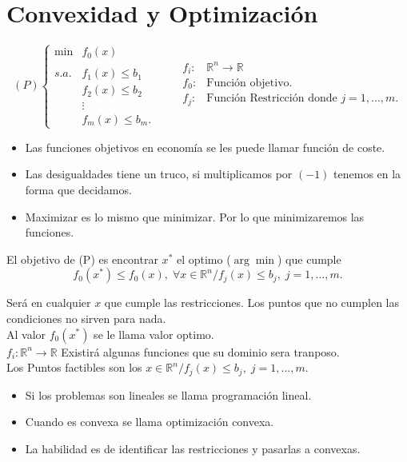 \chapter{Convexidad y Optimización}

$$
(P)
\left\{
\begin{array}{rl}
    \min & f_0(x)\\\\
    s.a. & f_1(x) \leq b_1\\
	 &f_2(x) \leq b_2\\
	 & \vdots\\
	 & f_m(x) \leq b_m.
\end{array}
\right.
\qquad
\begin{array}{rl}
    f_i: & \mathbb{R}^n \rightarrow \mathbb{R}\\
    f_0 : & \mbox{Función objetivo.}\\
    f_j : & \mbox{Función Restricción donde }j=1,\ldots,m.\\
\end{array}
$$

\begin{itemize}
    \item Las funciones objetivos en economía se les puede llamar función de coste.
    \item Las desigualdades tiene un truco, si multiplicamos por $(-1)$ tenemos en la forma que decidamos.
    \item Maximizar es lo mismo que minimizar. Por lo que minimizaremos las funciones. 
\end{itemize}

El objetivo de (P) es encontrar $x^*$ el optimo ($\arg\min$) que cumple 
$$f_0(x^*)\leq f_0(x), \;\forall x\in \mathbb{R}^n / f_j(x)\leq b_j,\; j=1,\ldots,m.$$

Será en cualquier $x$ que cumple las restricciones. Los puntos que no cumplen las condiciones no sirven para nada.\\

Al valor $f_0(x^*)$ se le llama valor optimo.\\

$f_i:  \mathbb{R}^n \rightarrow \mathbb{R}$ Existirá algunas funciones que su dominio sera tranposo.\\

Los Puntos factibles son los $x\in \mathbb{R}^n / f_j(x)\leq b_j,\; j=1,\ldots,m.$\\

\begin{itemize}
    \item  Si los problemas son lineales se llama programación lineal.
    \item Cuando es convexa se llama optimización convexa.
    \item La habilidad es de identificar las restricciones y pasarlas a convexas.
\end{itemize}


